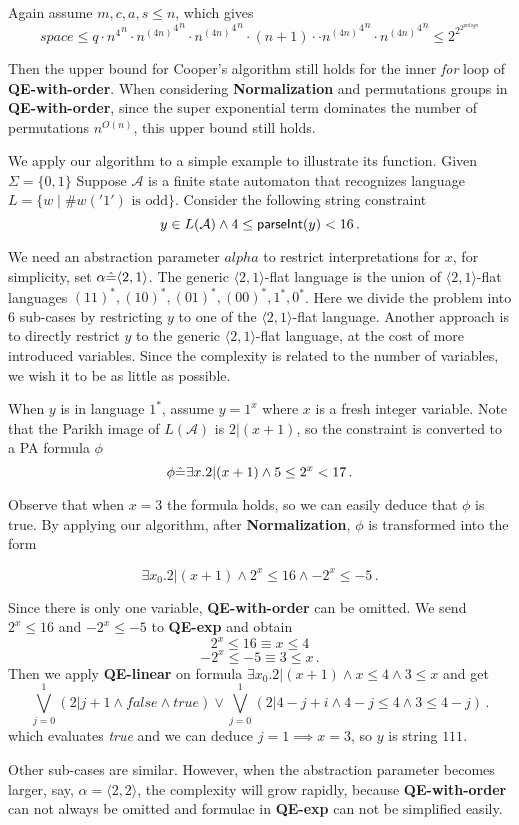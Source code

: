 Again assume $m,c,a,s\le n$, which gives 
$$
\textit{space}\le q \cdot {n^4}^n \cdot {{n^{(4n)}}^4}^n \cdot
{{n^{(4n)}}^4}^n \cdot (n+1) \cdot 
\cdot {{n^{(4n)}}^4}^n \cdot {{n^{(4n)}}^4}^n
\le 2^{2^{2^{p n \textit{log}n}}}
$$

Then the upper bound for Cooper's algorithm still holds for the inner \textit{for} loop of \textbf{QE-with-order}.
When considering \textbf{Normalization} and permutations groups in \textbf{QE-with-order},
since the super exponential term dominates the number of permutations $n^{O(n)}$,
this upper bound still holds.



 

We apply our algorithm to a simple example to 
illustrate its function.
Given $\Sigma = \{0,1\}$
Suppose $\mathcal{A}$ is a finite state automaton
that recognizes language $L = \{ w \mid \#w('1') \text{ is odd}\}$.
Consider the following string constraint
$$y\in L(\mathcal{A})\wedge 4\le  \textsf{parseInt}(y) < 16\,.$$

We need an abstraction parameter $alpha$ to restrict interpretations
for $x$, for simplicity, set $\alpha\hat{=} \langle 2,1 \rangle$.
The generic $\langle 2,1 \rangle$-flat language is the union of 
$\langle 2,1 \rangle$-flat languages $(11)^*,(10)^*,(01)^*,(00)^*,1^*,0^*$.
Here we divide the problem into 6 sub-cases by restricting $y$
to one of the $\langle 2,1 \rangle$-flat language.
Another approach is to directly restrict $y$ to 
the generic $\langle 2,1 \rangle$-flat language,
at the cost of more introduced variables.
Since the complexity is related to the number of variables,
we wish it to be as little as possible.

When $y$ is in language $1^*$, assume $y = 1^x$ where $x$
is a fresh integer variable.
Note that the Parikh image of $L(\mathcal{A})$ is $2|( x+1)$, 
so the constraint is converted to a PA formula $\phi$
$$\phi\hat{=} \exists x. 2|(x+1) \wedge 5 \le 2^{x} < 17\,.$$

Observe that when $x=3$ the formula holds,
so we can easily deduce that $\phi$ is true.  
By applying our algorithm,
after \textbf{Normalization},
$\phi$ is transformed into the form 

$$\exists x_0. 2|(x+1)\wedge  2^{x}\le 16 \wedge -2^{x}\le -5\,.$$

Since there is only one variable, 
\textbf{QE-with-order} can be omitted.
We send $2^x\le 16$ and $-2^x \le -5$ to \textbf{QE-exp} and obtain
$$2^x\le 16 \equiv x \le 4$$
$$-2^x\le -5 \equiv 3\le x\,.$$ 
Then we apply \textbf{QE-linear} on formula $\exists x_0. 2|(x+1) \wedge x\le 4 \wedge 3\le x$ and get
$$\bigvee_{j=0}^1(2| j+1 \wedge \textit{false} \wedge \textit{true})\vee \bigvee_{j=0}^1 (2|4-j+i\wedge 4-j\le 4 \wedge 3\le 4-j) \,.$$
which evaluates \textit{true} and we can deduce $j=1\implies x=3$, so $y$ is string $111$.

Other sub-cases are similar. However, when the abstraction parameter becomes larger,
say, $\alpha =\langle 2,2 \rangle$,
the complexity will grow rapidly,
because \textbf{QE-with-order} can not always be omitted and formulae in \textbf{QE-exp} can not be simplified easily.